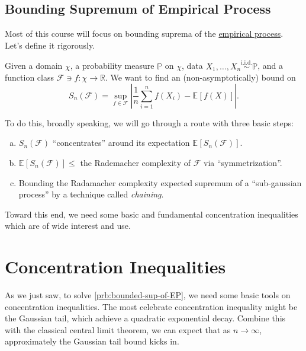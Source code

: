 \section{Bounding Supremum of Empirical Process}
Most of this course will focus on bounding suprema of the \hyperref[def:EP]{empirical process}. Let's define it rigorously.

\begin{problem}\label{prb:bounded-sup-of-EP}
Given a domain \(\chi \), a probability measure \(\mathbb{P} \) on \(\chi \), data \(X_1, \dots , X_n \overset{\text{i.i.d.} }{\sim } \mathbb{P} \), and a function class \(\mathscr{F}\ni f \colon \chi \to \mathbb{R}  \). We want to find an (non-asymptotically) bound on
\[
	S_n(\mathscr{F} ) = \sup _{f\in \mathscr{F} } \left\vert \frac{1}{n} \sum_{i=1}^{n} f(X_i) - \mathbb{E}_{}\left[f(X) \right]  \right\vert.
\]
\end{problem}
\begin{answer}
	To do this, broadly speaking, we will go through a route with three basic steps:
	\begin{enumerate}[(a)]
		\item \(S_n(\mathscr{F} )\) ``concentrates'' around its expectation \(\mathbb{E}_{}\left[S_n(\mathscr{F} ) \right] \).
		\item \(\mathbb{E}_{}\left[S_n(\mathscr{F} ) \right] \leq \) the Rademacher complexity of \(\mathscr{F} \) via ``symmetrization''.
		\item Bounding the Radamacher complexity expected supremum of a ``sub-gaussian process'' by a technique called \emph{chaining}.
	\end{enumerate}
\end{answer}

Toward this end, we need some basic and fundamental concentration inequalities which are of wide interest and use.

\chapter{Concentration Inequalities}
As we just saw, to solve \autoref{prb:bounded-sup-of-EP}, we need some basic tools on concentration inequalities. The most celebrate concentration inequality might be the Gaussian tail, which achieve a quadratic exponential decay. Combine this with the classical central limit theorem, we can expect that as \(n \to \infty \), approximately the Gaussian tail bound kicks in.

